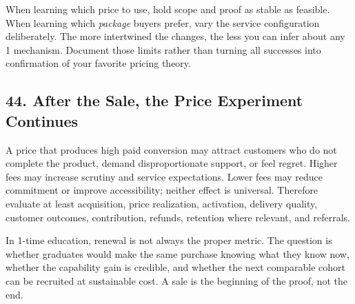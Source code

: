 When learning which price to use, hold scope and proof as stable as feasible. When learning which \emph{package} buyers prefer, vary the service configuration deliberately. The more intertwined the changes, the less you can infer about any 1 mechanism. Document those limits rather than turning all successes into confirmation of your favorite pricing theory.

\subsection*{44. After the Sale, the Price Experiment Continues}

A price that produces high paid conversion may attract customers who do not complete the product, demand disproportionate support, or feel regret. Higher fees may increase scrutiny and service expectations. Lower fees may reduce commitment or improve accessibility; neither effect is universal. Therefore evaluate at least acquisition, price realization, activation, delivery quality, customer outcomes, contribution, refunds, retention where relevant, and referrals.

In 1-time education, renewal is not always the proper metric. The question is whether graduates would make the same purchase knowing what they know now, whether the capability gain is credible, and whether the next comparable cohort can be recruited at sustainable cost. A sale is the beginning of the proof, not the end.
